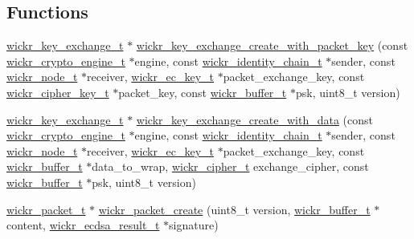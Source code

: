 \subsection*{Functions}
\begin{DoxyCompactItemize}
\item 
\mbox{\hyperlink{structwickr__key__exchange}{wickr\+\_\+key\+\_\+exchange\+\_\+t}} $\ast$ \mbox{\hyperlink{group__wickr__protocol_gac21e7b7fda1612923d83e7e75166209c}{wickr\+\_\+key\+\_\+exchange\+\_\+create\+\_\+with\+\_\+packet\+\_\+key}} (const \mbox{\hyperlink{structwickr__crypto__engine}{wickr\+\_\+crypto\+\_\+engine\+\_\+t}} $\ast$engine, const \mbox{\hyperlink{structwickr__identity__chain}{wickr\+\_\+identity\+\_\+chain\+\_\+t}} $\ast$sender, const \mbox{\hyperlink{structwickr__node}{wickr\+\_\+node\+\_\+t}} $\ast$receiver, \mbox{\hyperlink{structwickr__ec__key}{wickr\+\_\+ec\+\_\+key\+\_\+t}} $\ast$packet\+\_\+exchange\+\_\+key, const \mbox{\hyperlink{structwickr__cipher__key}{wickr\+\_\+cipher\+\_\+key\+\_\+t}} $\ast$packet\+\_\+key, const \mbox{\hyperlink{structwickr__buffer}{wickr\+\_\+buffer\+\_\+t}} $\ast$psk, uint8\+\_\+t version)
\item 
\mbox{\hyperlink{structwickr__key__exchange}{wickr\+\_\+key\+\_\+exchange\+\_\+t}} $\ast$ \mbox{\hyperlink{group__wickr__protocol_ga2b967bbdd161d8e37d19c4ab9621771b}{wickr\+\_\+key\+\_\+exchange\+\_\+create\+\_\+with\+\_\+data}} (const \mbox{\hyperlink{structwickr__crypto__engine}{wickr\+\_\+crypto\+\_\+engine\+\_\+t}} $\ast$engine, const \mbox{\hyperlink{structwickr__identity__chain}{wickr\+\_\+identity\+\_\+chain\+\_\+t}} $\ast$sender, const \mbox{\hyperlink{structwickr__node}{wickr\+\_\+node\+\_\+t}} $\ast$receiver, \mbox{\hyperlink{structwickr__ec__key}{wickr\+\_\+ec\+\_\+key\+\_\+t}} $\ast$packet\+\_\+exchange\+\_\+key, const \mbox{\hyperlink{structwickr__buffer}{wickr\+\_\+buffer\+\_\+t}} $\ast$data\+\_\+to\+\_\+wrap, \mbox{\hyperlink{structwickr__cipher}{wickr\+\_\+cipher\+\_\+t}} exchange\+\_\+cipher, const \mbox{\hyperlink{structwickr__buffer}{wickr\+\_\+buffer\+\_\+t}} $\ast$psk, uint8\+\_\+t version)
\item 
\mbox{\hyperlink{structwickr__packet}{wickr\+\_\+packet\+\_\+t}} $\ast$ \mbox{\hyperlink{group__wickr__protocol_gac952913ddaf848d2def181cd55b30883}{wickr\+\_\+packet\+\_\+create}} (uint8\+\_\+t version, \mbox{\hyperlink{structwickr__buffer}{wickr\+\_\+buffer\+\_\+t}} $\ast$content, \mbox{\hyperlink{structwickr__ecdsa__result}{wickr\+\_\+ecdsa\+\_\+result\+\_\+t}} $\ast$signature)
\item 

\end{DoxyCompactItemize}
